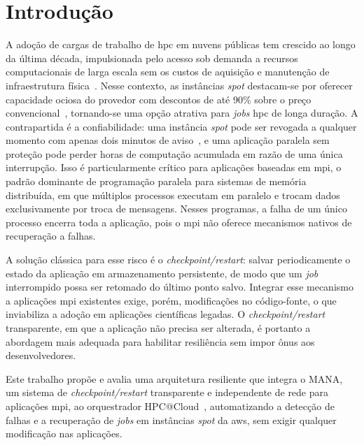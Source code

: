 \documentclass[a4paper,11pt]{article}
\begin{document}
    \tableofcontents
    \glsresetall

    \section{Introdução}

        A adoção de cargas de trabalho de \gls{hpc} em
        nuvens públicas tem crescido ao longo da última década, impulsionada pelo
        acesso sob demanda a recursos computacionais de larga escala sem os custos de
        aquisição e manutenção de infraestrutura física~\cite{netto2018hpccloud,mell2011nist}.
        Nesse contexto, as instâncias \textit{spot} destacam-se por oferecer capacidade
        ociosa do provedor com descontos de até 90\% sobre o preço
        convencional~\cite{aws2018spot}, tornando-se uma opção atrativa para
        \textit{jobs} \gls{hpc} de longa duração. A contrapartida é a confiabilidade: uma
        instância \textit{spot} pode ser revogada a qualquer momento com apenas dois
        minutos de aviso~\cite{aws2026spot_termination}, e uma aplicação paralela sem
        proteção pode perder horas de computação acumulada em razão de uma única
        interrupção. Isso é particularmente crítico para aplicações baseadas em \gls{mpi},
        o padrão dominante de programação paralela para sistemas de memória distribuída,
        em que múltiplos processos executam em paralelo e trocam dados exclusivamente
        por troca de mensagens. Nesses programas, a falha de um único processo encerra
        toda a aplicação, pois o \gls{mpi} não oferece mecanismos nativos de recuperação
        a falhas.

        A solução clássica para esse risco é o \textit{checkpoint/restart}: salvar
        periodicamente o estado da aplicação em armazenamento persistente, de modo que
        um \textit{job} interrompido possa ser retomado do último ponto salvo. Integrar
        esse mecanismo a aplicações \gls{mpi} existentes exige, porém, modificações no
        código-fonte, o que inviabiliza a adoção em aplicações científicas legadas.
        O \textit{checkpoint/restart} transparente, em que a aplicação não precisa ser
        alterada, é portanto a abordagem mais adequada para habilitar resiliência sem
        impor ônus aos desenvolvedores.

        Este trabalho propõe e avalia uma arquitetura resiliente que integra o MANA,
        um sistema de \textit{checkpoint/restart} transparente e independente de rede
        para aplicações \gls{mpi}, ao orquestrador HPC@Cloud~\cite{munhoz2024hpccloud},
        automatizando a detecção de falhas e a recuperação de \textit{jobs} em
        instâncias \textit{spot} da \gls{aws}, sem exigir qualquer modificação nas aplicações.
\end{document}

